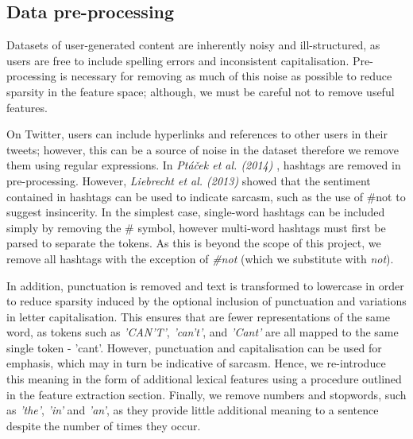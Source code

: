 \documentclass[12pt,a4paper]{article}
\begin{document}
\subsection{Data pre-processing}
\vspace{-4.2pt}
\noindent Datasets of user-generated content are inherently noisy and ill-structured, as users are free to include spelling errors and inconsistent capitalisation. Pre-processing is necessary for removing as much of this noise as possible to reduce sparsity in the feature space; although, we must be careful not to remove useful features.\\ \vspace{-10pt}

On Twitter, users can include hyperlinks and references to other users in their tweets; however, this can be a source of noise in the dataset therefore we remove them using regular expressions. In \textit{Pt{\'a}{\v{c}ek et al. (2014)}} \cite{ptavcek2014sarcasm}, hashtags are removed in pre-processing. However, \textit{Liebrecht et al. (2013)} \cite{liebrecht2013perfect} showed that the sentiment contained in hashtags can be used to indicate sarcasm, such as the use of \#not to suggest insincerity. In the simplest case, single-word hashtags can be included simply by removing the \# symbol, however multi-word hashtags must first be parsed to separate the tokens. As this is beyond the scope of this project, we remove all hashtags with the exception of \textit{\#not} (which we substitute with \textit{not}).\\\vspace{-10pt}

In addition, punctuation is removed and text is transformed to lowercase in order to reduce sparsity induced by the optional inclusion of punctuation and variations in letter capitalisation. This ensures that are fewer representations of the same word, as tokens such as \textit{'CAN'T'}, \textit{'can't'}, and \textit{'Cant'} are all mapped to the same single token - 'cant'. However, punctuation and capitalisation can be used for emphasis, which may in turn be indicative of sarcasm. Hence, we re-introduce this meaning in the form of additional lexical features using a procedure outlined in the feature extraction section. Finally, we remove numbers and stopwords, such as \textit{'the'}, \textit{'in'} and \textit{'an'}, as they provide little additional meaning to a sentence despite the number of times they occur.\vspace{-5pt}
\end{document}
